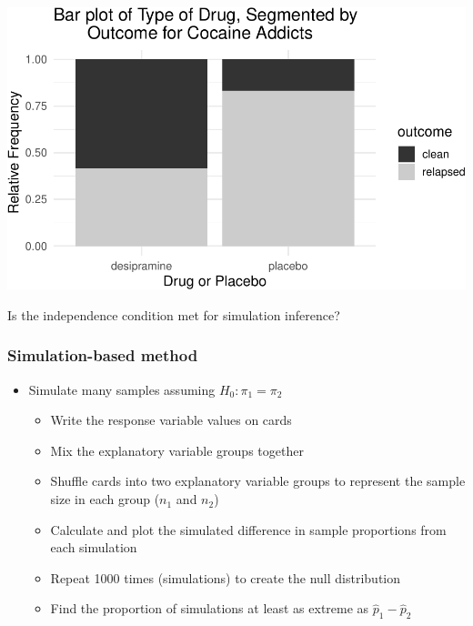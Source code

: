 \documentclass[
]{report}
\begin{document}
\begin{center}\includegraphics[width=0.6\linewidth]{08-VN08-two-cat-simulation_files/figure-latex/unnamed-chunk-13-1} \end{center}

Is the independence condition met for simulation inference?

\vspace{0.4in}

\subsubsection*{Simulation-based method}\label{simulation-based-method-4}

\begin{itemize}
\item
  Simulate many samples assuming \(H_0: \pi_1 = \pi_2\)

  \begin{itemize}
  \item
    Write the response variable values on cards
  \item
    Mix the explanatory variable groups together
  \item
    Shuffle cards into two explanatory variable groups to represent the sample size in each group (\(n_1\) and \(n_2\))
  \item
    Calculate and plot the simulated difference in sample proportions from each simulation
  \item
    Repeat 1000 times (simulations) to create the null distribution
  \item
    Find the proportion of simulations at least as extreme as \(\hat{p}_1 - \hat{p}_2\)
  \end{itemize}
\end{itemize}
\end{document}
